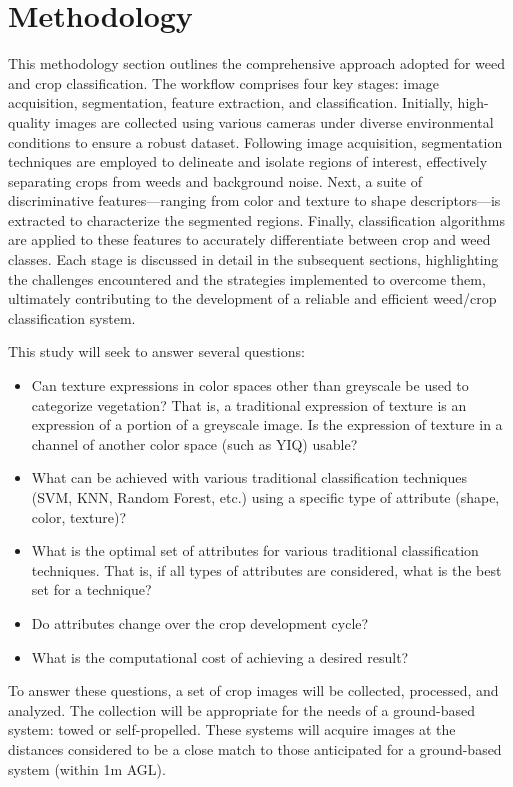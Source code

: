 \documentclass[letterpaper]{report}
\begin{document}
\chapter{Methodology}
\label{section:methodology}
This methodology section outlines the comprehensive approach adopted for weed and crop classification. The workflow comprises four key stages: image acquisition, segmentation, feature extraction, and classification. Initially, high-quality images are collected using various cameras under diverse environmental conditions to ensure a robust dataset. Following image acquisition, segmentation techniques are employed to delineate and isolate regions of interest, effectively separating crops from weeds and background noise. Next, a suite of discriminative features—ranging from color and texture to shape descriptors—is extracted to characterize the segmented regions. Finally,  classification algorithms are applied to these features to accurately differentiate between crop and weed classes. Each stage is discussed in detail in the subsequent sections, highlighting the challenges encountered and the strategies implemented to overcome them, ultimately contributing to the development of a reliable and efficient weed/crop classification system.

This study will seek to answer several questions:
\begin{itemize}
	\item{Can texture expressions in color spaces other than greyscale be used to categorize vegetation? That is, a traditional expression of texture is an expression of a portion of a greyscale image. Is the expression of texture in a channel of another color space (such as YIQ) usable?}
	\item{What can be achieved with various traditional classification techniques (SVM, KNN, Random Forest, etc.) using a specific type of attribute (shape, color, texture)?}
	\item{What is the optimal set of attributes for various traditional classification techniques. That is, if all types of attributes are considered, what is the best set for a technique?}
	\item{Do attributes change over the crop development cycle?}
	\item{What is the computational cost of achieving a desired result?}
\end{itemize}

To answer these questions, a set of crop images will be collected, processed, and analyzed. The collection will be appropriate for the needs of a ground-based system: towed or self-propelled. These systems will acquire images at the distances considered to be a close match to those anticipated for a ground-based system (within 1m \gls{AGL}).
\end{document}
